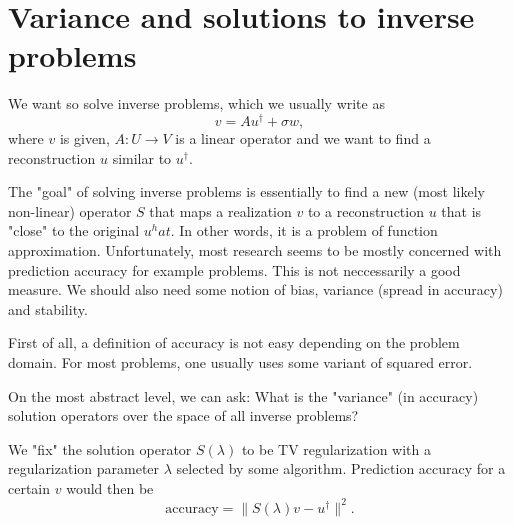\documentclass{article}
\begin{document}
\section{Variance and solutions to inverse problems}

We want so solve inverse problems, which we usually write as
\begin{equation}
    v = Au^\dagger + \sigma w,
\end{equation}
where $v$ is given, $A: U \rightarrow V$ is a linear operator  and we want to find a reconstruction $u$ similar to $u^\dagger$.

The "goal" of solving inverse problems is essentially to find a new (most likely non-linear) operator $S$ that maps a realization $v$ to a reconstruction $u$ that is "close" to the original $u^hat$.
In other words, it is a problem of function approximation. Unfortunately, most research seems to be mostly concerned with prediction accuracy for example problems. This is not neccessarily a good measure. We should also need some notion of bias, variance (spread in accuracy) and stability. 

First of all, a definition of accuracy is not easy depending on the problem domain. For most problems, one usually uses some variant of squared error. 

On the most abstract level, we can ask: What is the "variance" (in accuracy)  solution operators over the space of all inverse problems?

We "fix" the solution operator $S(\lambda)$ to be TV regularization with a regularization parameter $\lambda$ selected by some algorithm. 
Prediction accuracy for a certain $v$ would then be 
\begin{equation}
    \text{accuracy} = \|S(\lambda)v - u^\dagger\|^2.
\end{equation}
\end{document}
